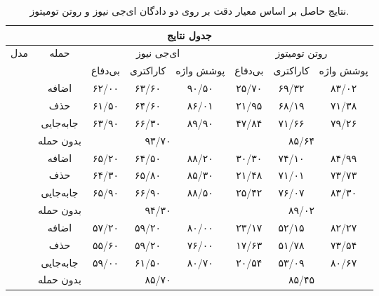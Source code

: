 \begin{table}[h]
	\centering
	\caption{نتایج حاصل بر اساس معیار دقت بر روی دو دادگان ای‌جی نیوز و روتن تومیتوز.}
	\label{rotagtable}
	\begin{tabular}{ |c||c|c|c|c|c|c|c| }
		\hline
		\multicolumn{8}{|c|}{\textbf{جدول نتایج}} \\
		\hline
		\multirow{2}{*}{مدل} & \multirow{2}{*}{حمله} & \multicolumn{3}{|c|}{ای‌جی نیوز} & \multicolumn{3}{|c|}{روتن تومیتوز}\\\cline{3-8}
		
		&  & بی‌دفاع & ‌کاراکتری & پوشش واژه‌ & بی‌دفاع & ‌کاراکتری & پوشش واژه‌ \\
		\hline
		\multirow{3}{*}{\makecell{برت}}
		& اضافه & ۶۲/۰۰ & ۶۳/۶۰ & ۹۰/۵۰ & ۲۵/۷۰ & ‌۶۹/۳۲ & ۸۳/۰۲ \\
		& حذف  & ۶۱/۵۰ & ‌۶۴/۶۰ & ۸۶/۰۱ & ۲۱/۹۵ & ‌۶۸/۱۹ & ۷۱/۳۸ \\
		& جابه‌جایی  & ۶۳/۹۰ & ‌۶۶/۳۰ & ۸۹/۹۰ & ۴۷/۸۴ & ‌۷۱/۶۶ & ۷۹/۲۶\\\cline{3-8}
		& بدون حمله  & 
		\multicolumn{3}{|c|}{۹۳/۷۰} & \multicolumn{3}{|c|}{۸۵/۶۴} \\
		\hline
		\hline
		\multirow{3}{*}{\makecell{روبرتا}}
		& اضافه & ۶۵/۲۰ & ‌۶۴/۵۰ & ۸۸/۲۰ & ۳۰/۳۰ & ‌۷۴/۱۰ & ۸۴/۹۹ \\
		& حذف  & ۶۴/۳۰ & ‌۶۵/۸۰ & ۸۵/۳۰ & ۲۱/۴۸ & ‌۷۱/۰۱ & ۷۳/۷۳ \\
		& جابه‌جایی  & ۶۵/۹۰ & ‌۶۶/۹۰  & ۸۸/۵۰ & ۲۵/۴۲ & ‌۷۶/۰۷ & ۸۳/۳۰\\\cline{3-8}
		& بدون حمله  & 
		\multicolumn{3}{|c|}{۹۴/۳۰} & \multicolumn{3}{|c|}{۸۹/۰۲} \\
		\hline
		\hline
		\multirow{3}{*}{\makecell{آلبرت}}
		& اضافه & ۵۷/۲۰ & ‌۵۹/۲۰ & ۸۰/۰۰ & ۲۳/۱۷ & ‌۵۲/۱۵ & ۸۲/۲۷ \\
		& حذف  & ۵۵/۶۰ & ‌۵۹/۲۰ & ۷۶/۰۰ & ۱۷/۶۳ & ‌۵۱/۷۸ & ۷۳/۵۴ \\
		& جابه‌جایی  & ۵۹/۰۰ & ‌۶۱/۵۰  & ۸۰/۷۰ & ۲۰/۵۴ & ‌۵۳/۰۹ & ۸۰/۶۷\\\cline{3-8}
		& بدون حمله  & 
		\multicolumn{3}{|c|}{۸۵/۷۰} & \multicolumn{3}{|c|}{۸۵/۴۵} \\
		\hline
		
	\end{tabular}
\end{table}


